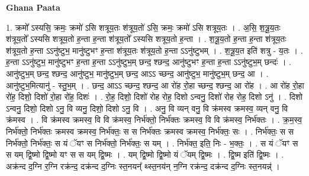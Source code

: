 \documentclass[17pt]{extarticle}
\begin{document}
\textbf{Ghana Paata } \newline

1. क्रमो᳚ ऽस्यसि॒ क्रमः॒ क्रमो॑ ऽसि शत्रूय॒तः श॑त्रूय॒तो॑ ऽसि॒ क्रमः॒ क्रमो॑ ऽसि शत्रूय॒तः । . अ॒सि॒ श॒त्रू॒य॒तः श॑त्रूय॒तो᳚ ऽस्यसि शत्रूय॒तो ह॒न्ता ह॒न्ता श॑त्रूय॒तो᳚ ऽस्यसि शत्रूय॒तो ह॒न्ता । . श॒त्रू॒य॒तो ह॒न्ता ह॒न्ता श॑त्रूय॒तः श॑त्रूय॒तो ह॒न्ता ऽऽनु॑ष्टुभ॒ मानु॑ष्टुभꣳ ह॒न्ता श॑त्रूय॒तः श॑त्रूय॒तो ह॒न्ता ऽऽनु॑ष्टुभम् । . श॒त्रू॒य॒त इति॑ शत्रु - य॒तः । . ह॒न्ता ऽऽनु॑ष्टुभ॒ मानु॑ष्टुभꣳ ह॒न्ता ह॒न्ता ऽऽनु॑ष्टुभ॒म् छन्द॒ श्छन्द॒ आनु॑ष्टुभꣳ ह॒न्ता ह॒न्ता ऽऽनु॑ष्टुभ॒म् छन्दः॑ । . आनु॑ष्टुभ॒म् छन्द॒ श्छन्द॒ आनु॑ष्टुभ॒ मानु॑ष्टुभ॒म् छन्द॒ आऽऽ च्छन्द॒ आनु॑ष्टुभ॒ मानु॑ष्टुभ॒म् छन्द॒ आ । . आनु॑ष्टुभ॒मित्यानु॑ - स्तु॒भ॒म् । . छन्द॒ आऽऽ च्छन्द॒ श्छन्द॒ आ रो॑ह रो॒हा च्छन्द॒ श्छन्द॒ आ रो॑ह । . आ रो॑ह रो॒हा रो॑ह॒ दिशो॒ दिशो॑ रो॒हा रो॑ह॒ दिशः॑ । . रो॒ह॒ दिशो॒ दिशो॑ रोह रोह॒ दिशो ऽन्वनु॒ दिशो॑ रोह रोह॒ दिशो ऽनु॑ । . दिशो ऽन्वनु॒ दिशो॒ दिशो ऽनु॒ वि व्यनु॒ दिशो॒ दिशो ऽनु॒ वि । . अनु॒ वि व्यन् वनु॒ वि क्र॑मस्व क्रमस्व॒ व्यन् वनु॒ वि क्र॑मस्व । . वि क्र॑मस्व क्रमस्व॒ वि वि क्र॑मस्व॒ निर्भ॑क्तो॒ निर्भ॑क्तः क्रमस्व॒ वि वि क्र॑मस्व॒ निर्भ॑क्तः । . क्र॒म॒स्व॒ निर्भ॑क्तो॒ निर्भ॑क्तः क्रमस्व क्रमस्व॒ निर्भ॑क्तः॒ स स निर्भ॑क्तः क्रमस्व क्रमस्व॒ निर्भ॑क्तः॒ सः । . निर्भ॑क्तः॒ स स निर्भ॑क्तो॒ निर्भ॑क्तः॒ स यं ॅयꣳ स निर्भ॑क्तो॒ निर्भ॑क्तः॒ स यम् । . निर्भ॑क्त॒ इति॒ निः - भ॒क्तः॒ । . स यं ॅयꣳ स स यम् द्वि॒ष्मो द्वि॒ष्मो यꣳ स स यम् द्वि॒ष्मः । . यम् द्वि॒ष्मो द्वि॒ष्मो यं ॅयम् द्वि॒ष्मः । . द्वि॒ष्म इति॑ द्वि॒ष्मः । . अक्र॑न्द द॒ग्नि र॒ग्नि रक्र॑न्द॒ दक्र॑न्द द॒ग्निः स्त॒नयन्᳚ थ्स्त॒नय॑न् न॒ग्नि रक्र॑न्द॒ दक्र॑न्द द॒ग्निः स्त॒नयन्न्॑ । \newline
\end{document}

